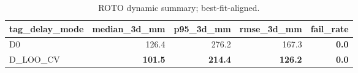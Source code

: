 \begin{table}[t]
\centering
\caption{ROTO dynamic summary; best-fit-aligned.}
\label{tab:roto_summary}
\begin{tabular}{lrrrr}
\hline
tag\_delay\_mode & median\_3d\_mm & p95\_3d\_mm & rmse\_3d\_mm & fail\_rate \\
\hline
D0 & 126.4 & 276.2 & 167.3 & \textbf{0.0} \\
D\_LOO\_CV & \textbf{101.5} & \textbf{214.4} & \textbf{126.2} & \textbf{0.0} \\
\hline
\end{tabular}
\end{table}
